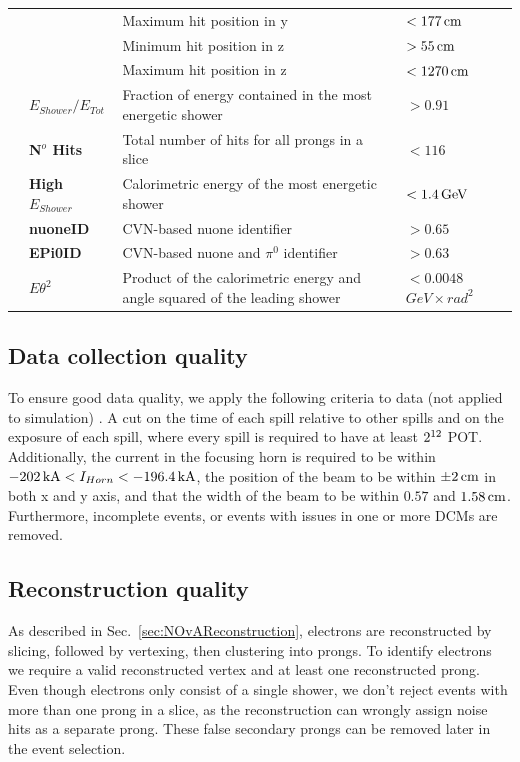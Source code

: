 \begin{table}[!hb]
\begin{tabular}{|m{2mm} m{} m{} m{}|}
& & Maximum hit position in y & $<\unit[177]{cm}$\\
& & Minimum hit position in z & $>\unit[55]{cm}$\\
& & Maximum hit position in z & $<\unit[1270]{cm}$\\\hline
\parbox[t]{2mm}{} &
\textbf{$E_{Shower}/E_{Tot}$} & Fraction of energy contained in the most energetic shower & $>0.91$\\
& \textbf{N$^o$ Hits} & Total number of hits for all prongs in a slice & $<116$\\
& \textbf{High $E_{Shower}$} & Calorimetric energy of the most energetic shower & $<\unit[1.4]{GeV}$\\
& \textbf{\acrshort{nuoneID}} & \gls{CVN}-based \gls{nuone} identifier & $>0.65$\\
& \textbf{\acrshort{EPi0ID}} & \gls{CVN}-based \gls{nuone} and $\pi^0$ identifier & $>0.63$\\
& \textbf{$E\theta^2$} & Product of the calorimetric energy and angle squared of the leading shower & $<0.0048$ $\unit{GeV\times rad^2}$\\\hline
\end{tabular}
\label{tab:EventSelectionSummary}
\end{table}

\subsection{Data collection quality}\label{sec:NuMMEventSelSpillCuts}
To ensure good data quality, we apply the following criteria to data (not applied to simulation) \cite{NOvA-doc-59876}. A cut on the time of each spill relative to other spills and on the exposure of each spill, where every spill is required to have at least $2\time10^{12}$ \gls{POT}. Additionally, the current in the focusing horn is required to be within $\unit[-202]{kA}<I_{Horn}<\unit[-196.4]{kA}$, the position of the beam to be within $\pm\unit[2]{cm}$ in both x and y axis, and that the width of the beam to be within $0.57$ and $\unit[1.58]{cm}$. Furthermore, incomplete events, or events with issues in one or more \glspl{DCM} are removed.

\subsection{Reconstruction quality}\label{sec:NuMMEventSelRecoQC}
As described in Sec.~\ref{sec:NOvAReconstruction}, electrons are reconstructed by slicing, followed by vertexing, then clustering into prongs. To identify electrons we require a valid reconstructed vertex and at least one reconstructed prong. Even though electrons only consist of a single shower, we don't reject events with more than one prong in a slice, as the reconstruction can wrongly assign noise hits as a separate prong. These false secondary prongs can be removed later in the event selection.

